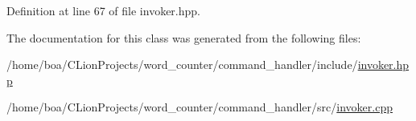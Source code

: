 Definition at line 67 of file invoker.\+hpp.



The documentation for this class was generated from the following files\+:\begin{DoxyCompactItemize}
\item 
/home/boa/\+C\+Lion\+Projects/word\+\_\+counter/command\+\_\+handler/include/\hyperlink{invoker_8hpp}{invoker.\+hpp}\item 
/home/boa/\+C\+Lion\+Projects/word\+\_\+counter/command\+\_\+handler/src/\hyperlink{invoker_8cpp}{invoker.\+cpp}\end{DoxyCompactItemize}
